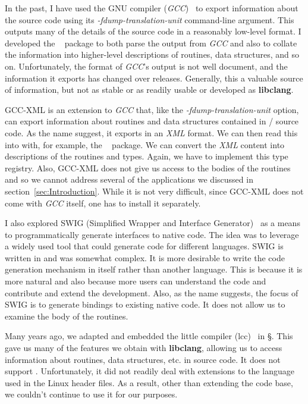 \documentclass[article]{jss}
\def\C{\proglang{C}}
\def\perl{\proglang{PERL}}
\def\Cpp{\proglang{C$++$}}
\def\R{\proglang{R}}
\def\Rpkg#1{\pkg{#1}}
\def\libclang{\textbf{libclang}}
\def\gcc{\textit{GCC}}
\def\XML{\textit{XML}}
\def\ShFlag#1{\textit{#1}}
\begin{document}
In the past, I have used the GNU compiler (\gcc)~\cite{bib:GCC} to
export information about the source code using its
\ShFlag{-fdump-translation-unit} command-line argument.  This outputs
many of the details of the source code in a reasonably low-level
format. I developed the \Rpkg{RGCCTranslationUnit}~\cite{bib:RGCCTU}
package to both parse the output from \gcc{} and also to collate the
information into higher-level descriptions of routines, data
structures, and so on.  Unfortunately, the format of \gcc's output is
not well document, and the information it exports has changed over
releases.  Generally, this a valuable source of information, but not
as stable or as readily usable or developed as \libclang.

GCC-XML is an extension to \gcc{} that, like the
\ShFlag{-fdump-translation-unit} option, can export information about
routines and data structures contained in \C/\Cpp{} source code.  As
the name suggest, it exports in an \XML{} format.  We can then read
this into \R{} with, for example, the \Rpkg{XML}~\cite{bib:RSXML}
package.  We can convert the \XML{} content into descriptions of the
routines and types.  Again, we have to implement this type registry.
Also, GCC-XML does not give us access to the bodies of the routines
and so we cannot address several of the applications we discussed in
section~\ref{sec:Introduction}.
While it is not very difficult, since GCC-XML does not come with
\gcc{} itself, one has to install it separately.


I also explored SWIG (Simplified Wrapper and Interface
Generator)~\cite{bib:SWIG} as a means to programmatically generate
interfaces to native code. The idea was to leverage a widely used tool
that could generate code for different languages.  SWIG is written in
\perl{} and was somewhat complex. It is more desirable to write the
code generation mechanism in \R{} itself rather than another language.
This is because it is more natural and also because more users can
understand the code and contribute and extend the development.  Also,
as the name suggests, the focus of SWIG is to generate bindings to
existing native code.  It does not allow us to examine the body of the
routines.


Many years ago, we adapted and embedded the little \C{} compiler
(lcc)~\cite{bib:lcc} in \S.  This gave us many of the features we
obtain with \libclang, allowing us to access information about
routines, data structures, etc. in source code.  It does not support
\Cpp. Unfortunately, it did not readily deal with extensions to the
\C{} language used in the Linux header files. As a result, other than
extending the code base, we couldn't continue to use it for our
purposes.
 
\end{document}
